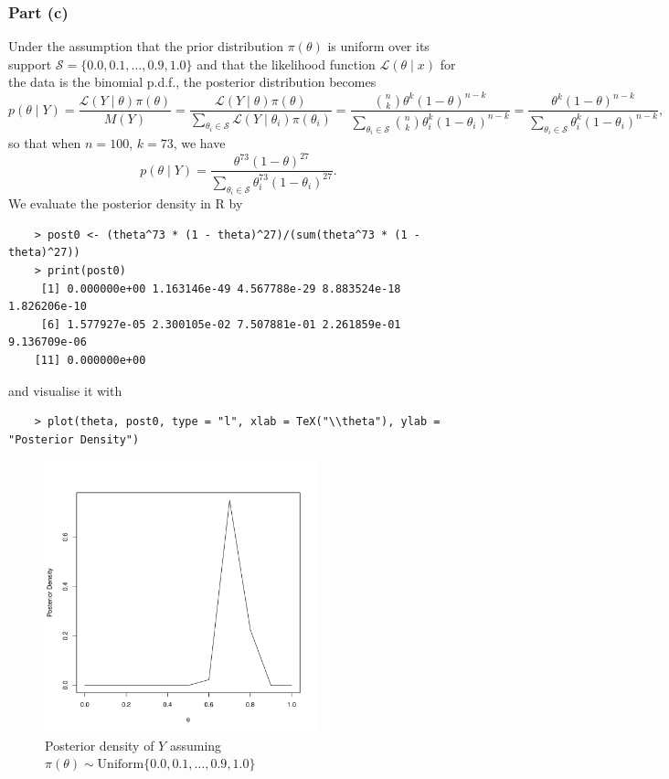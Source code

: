 \documentclass{report}
\begin{document}
\subsubsection*{Part (c)}
Under the assumption that the prior distribution $\pi(\theta)$ is uniform over its support $\mathcal{S} = \{0.0, 0.1, \ldots, 0.9, 1.0\}$ and that the likelihood function $\mathcal{L}(\theta \mid x)$ for the data is the binomial p.d.f., the posterior distribution becomes
\[
p(\theta \mid Y) 
= \frac{\mathcal{L}(Y \mid \theta) \pi(\theta)}{M(Y)}
= \frac{\mathcal{L}(Y \mid \theta) \pi(\theta)}{\sum_{\theta_i \in \mathcal S} \mathcal{L}(Y \mid \theta_i) \pi(\theta_i)}
= \frac{\binom{n}{k} \theta^k (1 - \theta)^{n - k}}{\sum_{\theta_i \in \mathcal{S}} \binom{n}{k} \theta_i^k (1 - \theta_i)^{n - k}}
= \frac{\theta^k (1 - \theta)^{n - k}}{\sum_{\theta_i \in \mathcal{S}} \theta_i^k (1 - \theta_i)^{n - k}},
\]
so that when $n = 100$, $k = 73$, we have
\[
p(\theta \mid Y) = \frac{\theta^{73} (1 - \theta)^{27}}{\sum_{\theta_i \in \mathcal{S}} \theta_i^{73} (1 - \theta_i)^{27}}.
\]
We evaluate the posterior density in \textsf{R} by
\begin{verbatim}
    > post0 <- (theta^73 * (1 - theta)^27)/(sum(theta^73 * (1 - theta)^27))
    > print(post0)
     [1] 0.000000e+00 1.163146e-49 4.567788e-29 8.883524e-18 1.826206e-10
     [6] 1.577927e-05 2.300105e-02 7.507881e-01 2.261859e-01 9.136709e-06
    [11] 0.000000e+00
\end{verbatim}
and visualise it with
\begin{verbatim}
    > plot(theta, post0, type = "l", xlab = TeX("\\theta"), ylab = "Posterior Density")
\end{verbatim}
\vspace*{-1cm}
\begin{figure}[H]
    \centering
    \includegraphics[width=0.7\textwidth]{binom_plot_posterior.pdf}
    \caption{Posterior density of $Y$ assuming $\pi(\theta) \sim \text{Uniform}\{0.0, 0.1, \ldots, 0.9, 1.0\}$}
    \label{fig:binom_plot_posterior_discrete}
\end{figure}
\end{document}

